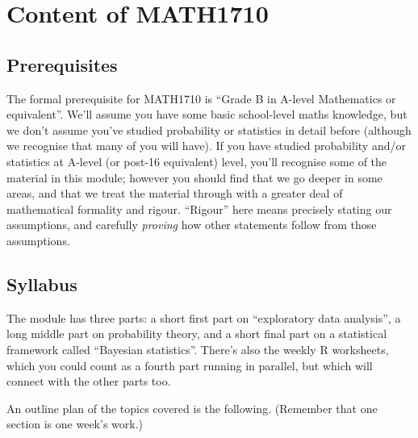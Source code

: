 \documentclass[
  a4paper,
]{book}
\theoremstyle{definition}
\theoremstyle{definition}
\theoremstyle{definition}
\theoremstyle{definition}
\theoremstyle{remark}
\begin{document}
\hypertarget{about-content}{%
\section*{Content of MATH1710}\label{about-content}}

\hypertarget{prereqs}{%
\subsection*{Prerequisites}\label{prereqs}}

The formal prerequisite for MATH1710 is ``Grade B in A-level Mathematics or equivalent''. We'll assume you have some basic school-level maths knowledge, but we don't assume you've studied probability or statistics in detail before (although we recognise that many of you will have). If you have studied probability and/or statistics at A-level (or post-16 equivalent) level, you'll recognise some of the material in this module; however you should find that we go deeper in some areas, and that we treat the material through with a greater deal of mathematical formality and rigour. ``Rigour'' here means precisely stating our assumptions, and carefully \emph{proving} how other statements follow from those assumptions.

\hypertarget{syllabus}{%
\subsection*{Syllabus}\label{syllabus}}

The module has three parts: a short first part on ``exploratory data analysis'', a long middle part on probability theory, and a short final part on a statistical framework called ``Bayesian statistics''. There's also the weekly R worksheets, which you could count as a fourth part running in parallel, but which will connect with the other parts too.

An outline plan of the topics covered is the following. (Remember that one section is one week's work.)
\end{document}
